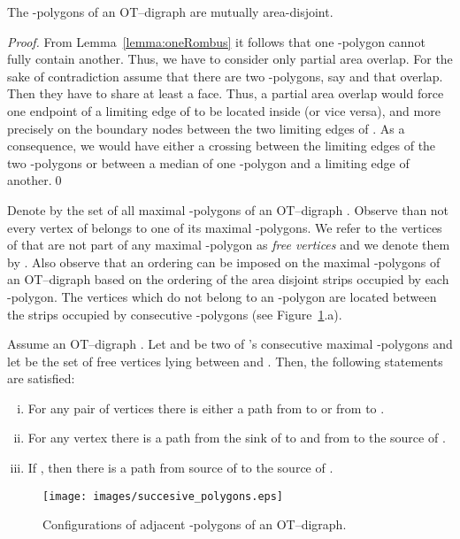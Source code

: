 \documentclass{myllncs-mixalis}
\begin{document}
\begin{lemma}
\label{lem:areaDisjointPolygons}
 The -polygons of an
OT--digraph  are mutually area-disjoint.
\end{lemma}
\begin{proof}
From Lemma~\ref{lemma:oneRombus} it follows that one -polygon
cannot fully contain another. Thus, we have to consider only partial
area overlap. For the sake of contradiction assume that there are
two -polygons, say  and   that overlap. Then they have
to share at least a face. Thus, a partial area overlap would force
one endpoint of a limiting edge of  to be located inside 
(or vice versa), and more precisely on the boundary nodes between
the two limiting edges of . As a consequence, we would have
either a crossing between the limiting edges of the two
-polygons or between a median of one -polygon and a limiting
edge of another.\qed
\end{proof}

Denote by  the set of all maximal -polygons of
an OT--digraph .  Observe than not every vertex of 
belongs to one of its maximal -polygons. We refer to  the
vertices of  that are not part of any maximal -polygon as
\emph{free vertices} and we denote them by .
 Also observe that
an ordering can be imposed on the maximal -polygons of an
OT--digraph  based on the ordering of the area disjoint
strips occupied by each -polygon. The vertices which do not
belong to an -polygon are located between the strips occupied by
consecutive -polygons (see
Figure~\ref{fig:succesivePolygons}.a).



\begin{lemma}
\label{lem:pahtProperties}
 Assume an OT--digraph . Let
 and  be two of 's consecutive maximal -polygons
and let  be the set of free vertices
lying between  and . Then, the following statements are
satisfied: \vspace*{-.5cm}
\begin{enumerate}[(i)]
\item For any pair of vertices  there is either a path
from  to  or from  to .
\item For any vertex  there is a path from the sink of 
to  and from  to the source of .
\item If , then there is a path from source of 
to the source of .
\end{enumerate}
\end{lemma}

\begin{figure}[htb]
    \centering
    \texttt{[image: images/succesive\_polygons.eps]}
    \caption{Configurations of adjacent -polygons of an OT--digraph.}
    \label{fig:succesivePolygons}
\end{figure}
\end{document}
